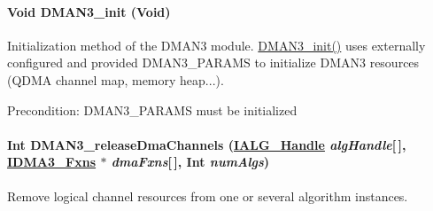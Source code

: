 \hypertarget{group___d_s_p_d_m_a_n3_gf0a672c8ba5962dabc8b319978aafd3b}{
\paragraph[DMAN3\_\-init]{\setlength{\rightskip}{0pt plus 5cm}Void DMAN3\_\-init (Void)}\hfill}
\label{group___d_s_p_d_m_a_n3_gf0a672c8ba5962dabc8b319978aafd3b}


Initialization method of the DMAN3 module. \hyperlink{group___d_s_p_d_m_a_n3_gf0a672c8ba5962dabc8b319978aafd3b}{DMAN3\_\-init()} uses externally configured and provided DMAN3\_\-PARAMS to initialize DMAN3 resources (QDMA channel map, memory heap...). 

\begin{Desc}
\item[Precondition:]DMAN3\_\-PARAMS must be initialized \end{Desc}
\hypertarget{group___d_s_p_d_m_a_n3_g664b5e2445c2ec3a0ed9e14f8cfc1d20}{
\paragraph[DMAN3\_\-releaseDmaChannels]{\setlength{\rightskip}{0pt plus 5cm}Int DMAN3\_\-release\-Dma\-Channels (\hyperlink{struct_i_a_l_g___obj}{IALG\_\-Handle} {\em alg\-Handle}\mbox{[}$\,$\mbox{]}, \hyperlink{struct_i_d_m_a3___fxns}{IDMA3\_\-Fxns} $\ast$ {\em dma\-Fxns}\mbox{[}$\,$\mbox{]}, Int {\em num\-Algs})}\hfill}
\label{group___d_s_p_d_m_a_n3_g664b5e2445c2ec3a0ed9e14f8cfc1d20}


Remove logical channel resources from one or several algorithm instances. 

